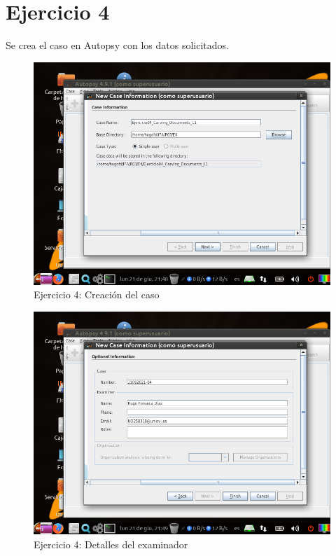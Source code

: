 \documentclass[11pt]{article}
\begin{document}
\section{Ejercicio 4}
Se crea el caso en Autopsy con los datos solicitados.

\begin{figure}[H]
  \caption{Ejercicio 4: Creación del caso}
  \centering
  \includegraphics[scale=0.7]{e4-1.png}
\end{figure}

\begin{figure}[H]
  \caption{Ejercicio 4: Detalles del examinador}
  \centering
  \includegraphics[scale=0.7]{e4-2.png}
\end{figure}
\end{document}
